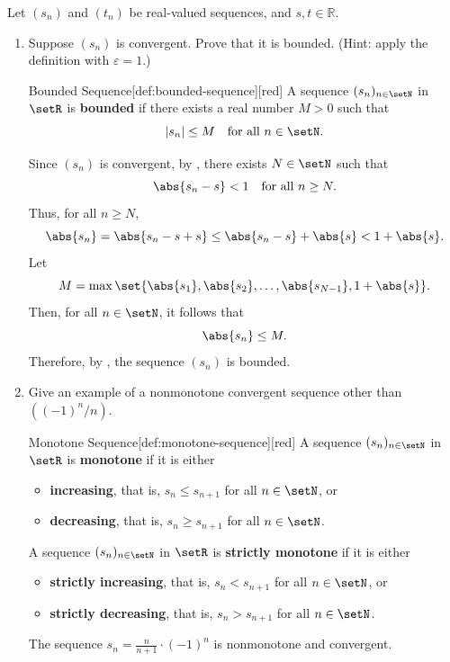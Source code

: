 Let $\left(s_n\right)$ and $\left(t_n\right)$ be real-valued sequences, and $s, t \in \mathbb{R}$.
\begin{enumerate}
  \item Suppose \((s_n)\) is convergent. Prove that it is bounded. (Hint: apply the definition with \(\varepsilon = 1\).)
  \begin{define}{Bounded Sequence}[def:bounded-sequence][red]
    A sequence \((s_n)_{n\in\setN}\) in \(\setR\) is \textbf{bounded} if there exists a real number \(M>0\) such that
    \[
      |s_n| \leq M \quad\text{for all } n \in \setN.
    \]
  \end{define}
  \begin{subprove}
    Since \((s_n)\) is convergent, by , there exists \(N \in \setN\) such that
    \[
      \abs{s_n - s} < 1 \quad\text{for all } n \geq N.
    \]
    Thus, for all \(n \geq N\),
    \[
      \abs{s_n} = \abs{s_n - s + s} \leq \abs{s_n - s} + \abs{s} < 1 + \abs{s}.
    \]
    Let
    \[
      M = \max\set{ \abs{s_1}, \abs{s_2}, \ldots, \abs{s_{N-1}}, 1 + \abs{s} }.
    \]
    Then, for all \(n \in \setN\), it follows that
    \[
      \abs{s_n} \leq M.
    \]
    Therefore, by , the sequence \((s_n)\) is bounded.
  \end{subprove}


  \newpage
  
  \item Give an example of a nonmonotone convergent sequence other than \(((-1)^n / n)\).
  \begin{define}{Monotone Sequence}[def:monotone-sequence][red]
    A sequence \((s_n)_{n\in\setN}\) in \(\setR\) is \textbf{monotone} if it is either
    \begin{itemize}
      \item \textbf{increasing}, that is, \(s_n \leq s_{n+1}\) for all \(n \in \setN\), or
      \item \textbf{decreasing}, that is, \(s_n \geq s_{n+1}\) for all \(n \in \setN\).
    \end{itemize}
    A sequence \((s_n)_{n\in\setN}\) in \(\setR\) is \textbf{strictly monotone} if it is either
    \begin{itemize}
      \item \textbf{strictly increasing}, that is, \(s_n < s_{n+1}\) for all \(n \in \setN\), or
      \item \textbf{strictly decreasing}, that is, \(s_n > s_{n+1}\) for all \(n \in \setN\).
    \end{itemize}
  \end{define}
  \begin{subanswer}
    The sequence \(s_n = \frac{n}{n+1}\cdot (-1)^n\) is nonmonotone and convergent.
  \end{subanswer}
  

\end{enumerate}
